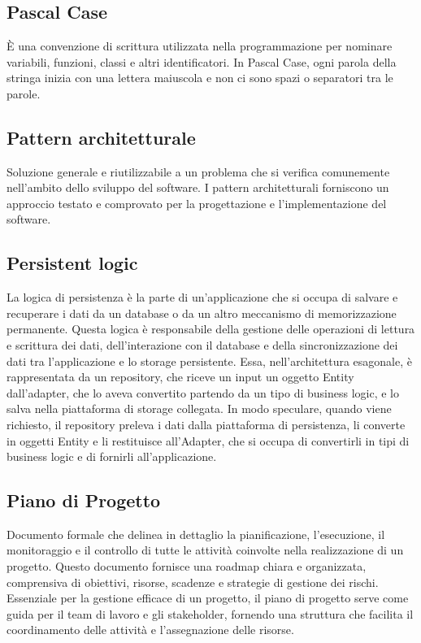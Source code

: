 
\section{}

\hypertarget{sec:Pascal Case}{}
\subsection*{Pascal Case}
È una convenzione di scrittura utilizzata nella programmazione per nominare variabili, funzioni, classi e altri identificatori. 
In Pascal Case, ogni parola della stringa inizia con una lettera maiuscola e non ci sono spazi o separatori tra le parole.

\hypertarget{sec:pattern_architetturale}{}
\subsection*{Pattern architetturale}
Soluzione generale e riutilizzabile a un problema che si verifica comunemente nell’ambito dello sviluppo del software. I pattern 
architetturali forniscono un approccio testato e comprovato per la progettazione e l’implementazione del software.

\hypertarget{sec:persistent_logic}{}
\subsection*{Persistent logic}
La logica di persistenza è la parte di un'applicazione che si occupa di salvare e recuperare i dati da un database o da un altro
meccanismo di memorizzazione permanente. Questa logica è responsabile della gestione delle operazioni di lettura e scrittura dei dati,
dell'interazione con il database e della sincronizzazione dei dati tra l'applicazione e lo storage persistente. Essa, nell'architettura
esagonale, è rappresentata da un repository, che riceve un input un oggetto Entity dall'adapter, che lo aveva convertito partendo da
un tipo di business logic, e lo salva nella piattaforma di storage collegata. In modo speculare, quando viene richiesto, il repository
preleva i dati dalla piattaforma di persistenza, li converte in oggetti Entity e li restituisce all'Adapter, che si occupa di
convertirli in tipi di business logic e di fornirli all'applicazione.

\subsection*{Piano di Progetto}
Documento formale che delinea in dettaglio la pianificazione, l’esecuzione, il monitoraggio e il controllo di tutte le attività coinvolte nella 
realizzazione di un progetto. Questo documento fornisce una roadmap chiara e organizzata, comprensiva di obiettivi, risorse, scadenze e strategie di 
gestione dei rischi. Essenziale per la gestione efficace di un progetto, il piano di progetto serve come guida per il team di lavoro e gli stakeholder, 
fornendo una struttura che facilita il coordinamento delle attività e l’assegnazione delle risorse.

